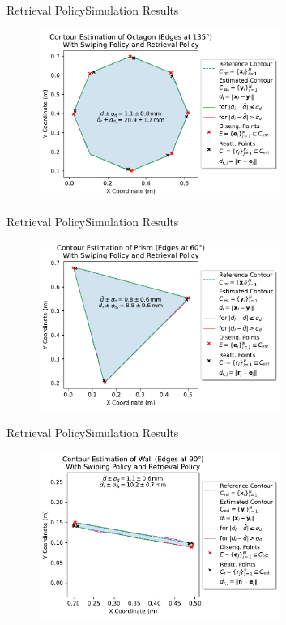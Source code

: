 \documentclass[AIRbeamer
,optEnglish
,optBiber
,optBibstyleAlphabetic
,optBeamerClassicFormat%
]{AIRlatex}
\begin{document}
    \begin{frame}{Retrieval Policy}{Simulation Results}
        \begin{figure}[htb]
            \centering
            \includegraphics[width=0.7\textwidth]{figures/experiments/octagon-edges-135deg-swiping-retrieval}
        \end{figure}
    \end{frame}
    \begin{frame}{Retrieval Policy}{Simulation Results}
        \begin{figure}[htb]
            \centering
            \includegraphics[width=0.7\textwidth]{figures/experiments/prism-edges-60deg-swiping-retrieval}
        \end{figure}
    \end{frame}
    \begin{frame}{Retrieval Policy}{Simulation Results}
        \begin{figure}[htb]
            \centering
            \includegraphics[width=0.7\textwidth]{figures/experiments/wall-edges-90deg-swiping-retrieval}
        \end{figure}
    \end{frame}
\end{document}
